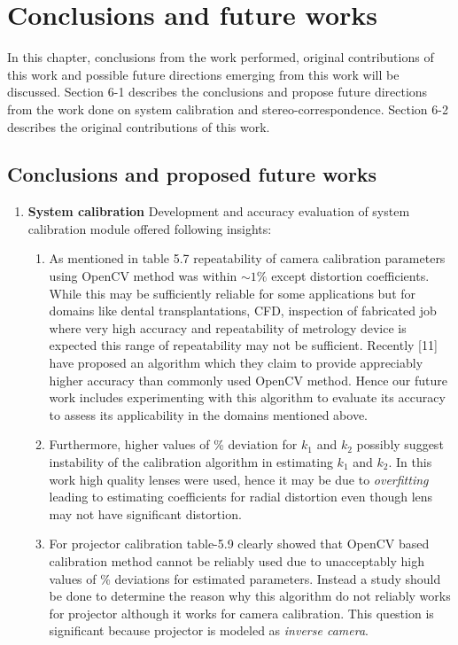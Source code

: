 \chapter{Conclusions and future works}
In this chapter, conclusions from the work performed, original contributions of this work and possible future directions emerging from this work will be discussed. Section 6-1 describes the conclusions and propose future directions from the work done on system calibration and stereo-correspondence. Section 6-2 describes the original contributions of this work.

\section{Conclusions and proposed future works}
\begin{enumerate}
\item \textbf{System calibration} \newline
Development and accuracy evaluation of system calibration module offered following insights: 
\begin{enumerate}
\item As mentioned in table 5.7 repeatability of camera calibration parameters using OpenCV method was within $\sim1\%$
except distortion coefficients. While this may be sufficiently reliable for some applications but for domains like dental transplantations, CFD, inspection of fabricated job where very high accuracy and repeatability of metrology device is expected this range of repeatability may not be sufficient. Recently [11] have proposed an algorithm which they claim to provide appreciably higher accuracy than commonly used OpenCV method. Hence our future work includes experimenting with this algorithm to evaluate its accuracy to assess its applicability in the domains mentioned above. 

\item Furthermore, higher values of \% deviation for $k_1$ and $k_2$ possibly suggest instability of the calibration algorithm in estimating $k_1$ and $k_2$. In this work high quality lenses were used, hence it may be due to \textit{overfitting} leading to estimating coefficients for radial distortion even though lens may not have significant distortion.   

\item For projector calibration table-5.9 clearly showed that OpenCV based calibration method cannot be reliably used due to unacceptably high values of \% deviations for estimated parameters. Instead a study should be done to determine the reason why this algorithm do not reliably works for projector although it works for camera calibration. This question is significant because projector is modeled as \textit{inverse camera}.


\end{enumerate}
\end{enumerate}
